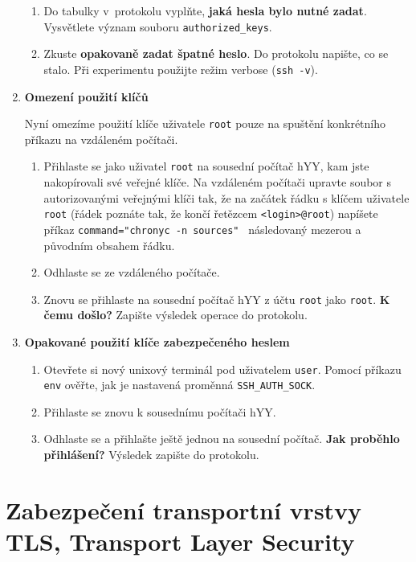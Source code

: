 \documentclass[a4paper,11pt]{article}
\begin{document}
\begin{enumerate}
\begin{enumerate}
      \item Do tabulky v~protokolu vyplňte, \textbf{jaká hesla bylo nutné zadat}. Vysvětlete význam souboru \texttt{authorized\_keys}.

      \item Zkuste \textbf{opakovaně zadat špatné heslo}. Do protokolu napište, co se stalo.
      Při experimentu použijte režim verbose (\texttt{ssh -v}).

    \end{enumerate}

  \item {\bf Omezení použití klíčů}

    Nyní omezíme použití klíče uživatele {\tt root} pouze na spuštění konkrétního příkazu na vzdáleném počítači.
    \begin{enumerate}
      \item Přihlaste se jako uživatel {\tt root} na sousední počítač hYY, kam jste nakopírovali své veřejné klíče. Na vzdáleném počítači upravte soubor s autorizovanými veřejnými klíči tak, že na začátek řádku s klíčem uživatele {\tt root} (řádek poznáte tak, že končí řetězcem {\tt <login>@root}) napíšete příkaz 
        \verb|command="chronyc -n sources" | následovaný mezerou a původním obsahem řádku.
      \item Odhlaste se ze vzdáleného počítače.
      \item Znovu se přihlaste na sousední počítač hYY z účtu {\tt root} jako \texttt{root}. \textbf{K čemu došlo?} Zapište výsledek operace do protokolu.
    \end{enumerate}


  \item {\bf Opakované použití klíče zabezpečeného heslem}

    \begin{enumerate}

      \item Otevřete si nový unixový terminál pod uživatelem {\tt user}. Pomocí příkazu \verb|env| ověřte, jak je nastavená proměnná \verb|SSH_AUTH_SOCK|.
      \item Přihlaste se znovu k sousednímu počítači hYY.
      \item Odhlaste se a přihlašte ještě jednou na sousední počítač. \textbf{Jak proběhlo přihlášení?} Výsledek zapište do protokolu.
    \end{enumerate}
\end{enumerate}

\section{Zabezpečení transportní vrstvy TLS, Transport Layer Security}
\end{document}
